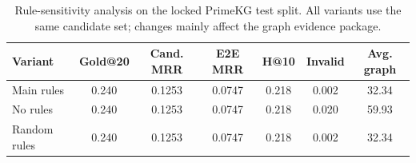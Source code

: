 \begin{table}[t]
\centering
\small
\caption{Rule-sensitivity analysis on the locked PrimeKG test split. All variants use the same candidate set; changes mainly affect the graph evidence package.}
\label{tab:rule-sensitivity}
\begin{tabular}{lcccccc}
\toprule
Variant & Gold@20 & Cand. MRR & E2E MRR & H@10 & Invalid & Avg. graph \\
\midrule
Main rules & 0.240 & 0.1253 & 0.0747 & 0.218 & 0.002 & 32.34 \\
No rules & 0.240 & 0.1253 & 0.0747 & 0.218 & 0.020 & 59.93 \\
Random rules & 0.240 & 0.1253 & 0.0747 & 0.218 & 0.002 & 32.34 \\
\bottomrule
\end{tabular}
\end{table}
